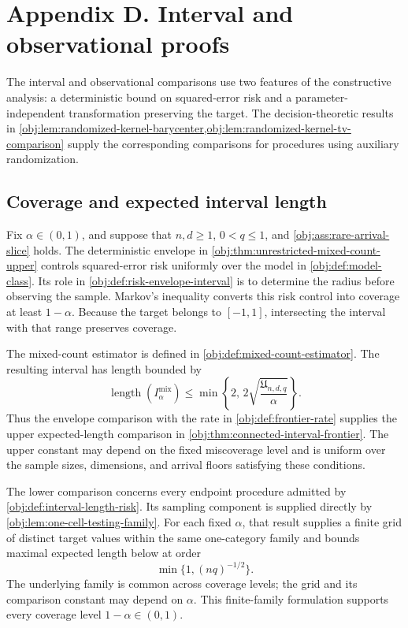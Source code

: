 \section{Appendix D. Interval and observational proofs}

The interval and observational comparisons use two features of the constructive analysis: a deterministic bound on squared-error risk and a parameter-independent transformation preserving the target. The decision-theoretic results in \cref{obj:lem:randomized-kernel-barycenter,obj:lem:randomized-kernel-tv-comparison} supply the corresponding comparisons for procedures using auxiliary randomization.

\subsection{Coverage and expected interval length}

Fix \(\alpha\in(0,1)\), and suppose that \(n,d\ge1\), \(0<q\le1\), and \cref{obj:ass:rare-arrival-slice} holds. The deterministic envelope  in \cref{obj:thm:unrestricted-mixed-count-upper} controls squared-error risk uniformly over the model in \cref{obj:def:model-class}. Its role in \cref{obj:def:risk-envelope-interval} is to determine the radius before observing the sample. Markov's inequality converts this risk control into coverage at least \(1-\alpha\). Because the target belongs to \([-1,1]\), intersecting the interval with that range preserves coverage.

The mixed-count estimator  is defined in \cref{obj:def:mixed-count-estimator}. The resulting interval  has length bounded by
\[
\operatorname{length}(I^{\mathrm{mix}}_\alpha)
\le
\min\left\{2,\,
2\sqrt{\frac{\mathfrak U_{n,d,q}}{\alpha}}\right\}.
\]
Thus the envelope comparison with the rate  in \cref{obj:def:frontier-rate} supplies the upper expected-length comparison in \cref{obj:thm:connected-interval-frontier}. The upper constant  may depend on the fixed miscoverage level and is uniform over the sample sizes, dimensions, and arrival floors satisfying these conditions.

The lower comparison concerns every endpoint procedure admitted by \cref{obj:def:interval-length-risk}. Its sampling component is supplied directly by \cref{obj:lem:one-cell-testing-family}. For each fixed \(\alpha\), that result supplies a finite grid of distinct target values within the same one-category family and bounds maximal expected length below at order
\[
\min\{1,(nq)^{-1/2}\}.
\]
The underlying family is common across coverage levels; the grid and its comparison constant may depend on \(\alpha\). This finite-family formulation supports every coverage level \(1-\alpha\in(0,1)\).

